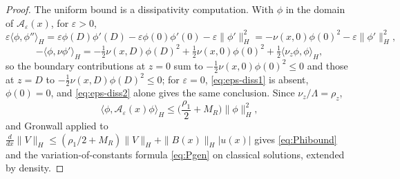 \documentclass[12pt]{article}
\theoremstyle{plain}
\theoremstyle{remark}
\newcommand{\Hs}{H}
\begin{document}
\begin{proof}
The uniform bound is a dissipativity computation. With $\phi$ in the domain of $\mathcal A_\varepsilon(x)$, for $\varepsilon>0$,
\begin{equation}
 \varepsilon\langle\phi,\phi''\rangle_\Hs
 =\varepsilon\phi(D)\phi'(D)-\varepsilon\phi(0)\phi'(0)-\varepsilon\|\phi'\|_\Hs^2
 =-\nu(x,0)\phi(0)^2-\varepsilon\|\phi'\|_\Hs^2,
 \label{eq:eps-diss1}
\end{equation}
\begin{equation}
 -\langle\phi,\nu\phi'\rangle_\Hs
 =-\tfrac12\nu(x,D)\phi(D)^2+\tfrac12\nu(x,0)\phi(0)^2
 +\tfrac12\langle\nu_z\phi,\phi\rangle_\Hs,
 \label{eq:eps-diss2}
\end{equation}
so the boundary contributions at $z=0$ sum to $-\tfrac12\nu(x,0)\phi(0)^2\le0$ and those at $z=D$ to $-\tfrac12\nu(x,D)\phi(D)^2\le0$; for $\varepsilon=0$, \eqref{eq:eps-diss1} is absent, $\phi(0)=0$, and \eqref{eq:eps-diss2} alone gives the same conclusion. Since $\nu_z/\Lambda=\rho_z$,
\begin{equation}
 \langle\phi,\mathcal A_\varepsilon(x)\phi\rangle_\Hs
 \le\Big(\frac{\rho_1}{2}+M_R\Big)\|\phi\|_\Hs^2,
 \label{eq:eps-diss3}
\end{equation}
and Gronwall applied to $\frac{d}{dx}\|V\|_\Hs\le(\rho_1/2+M_R)\|V\|_\Hs+\|B(x)\|_\Hs|u(x)|$ gives \eqref{eq:Phibound} and the variation-of-constants formula \eqref{eq:Pgen} on classical solutions, extended by density.


\end{proof}
\end{document}

